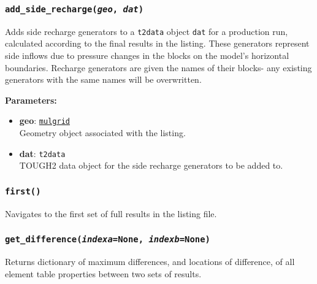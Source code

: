 \begin{snugshade}
\subsubsection{\texttt{add\_side\_recharge(\emph{geo}, \emph{dat})}}
\end{snugshade}
\label{sec:t2listing:add_side_recharge}

Adds side recharge generators to a \texttt{t2data} object \texttt{dat} for a production run, calculated according to the final results in the listing.  These generators represent side inflows due to pressure changes in the blocks on the model's horizontal boundaries.  Recharge generators are given the names of their blocks- any existing generators with the same names will be overwritten.

\textbf{Parameters:}
\begin{itemize}
\item \textbf{geo}: \hyperref[mulgrids]{\texttt{mulgrid}}\\
  Geometry object associated with the listing.
\item \textbf{dat}: \texttt{t2data}\\
  TOUGH2 data object for the side recharge generators to be added to.
\end{itemize}

\begin{snugshade}
\subsubsection{\texttt{first()}}
\end{snugshade}
\label{sec:t2listing:first}

Navigates to the first set of full results in the listing file.

\begin{snugshade}
\subsubsection{\texttt{get\_difference(\emph{indexa}=None, \emph{indexb}=None)}}
\end{snugshade}
\label{sec:t2listing:get_difference}

Returns dictionary of maximum differences, and locations of difference, of all element table properties between two sets of results.

